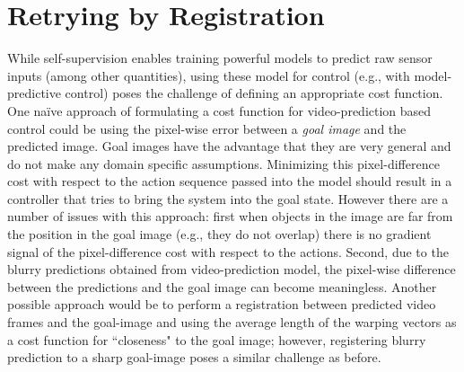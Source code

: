 \vspace{-0.1cm}
\section{Retrying by Registration}
\label{sec:reg}
\vspace{-0.2cm}




While self-supervision enables training powerful models to predict raw sensor inputs (among other quantities), using these model for control (e.g., with model-predictive control) poses the challenge of defining an appropriate cost function. One na\"{i}ve approach of formulating a cost function for video-prediction based control could be using the pixel-wise error between a \emph{goal image} and the predicted image. Goal images have the advantage that they are very general and do not make any domain specific assumptions. Minimizing this pixel-difference cost with respect to the action sequence passed into the model should result in a controller that tries to bring the system into the goal state. However there are a number of issues with this approach: first when objects in the image are far from the position in the goal image (e.g., they do not overlap) there is no gradient signal of the pixel-difference cost with respect to the actions. Second, due to the blurry predictions obtained from video-prediction model, the pixel-wise difference between the predictions and the goal image can become meaningless. Another possible approach would be to perform a registration between predicted video frames and the goal-image and using the average length of the warping vectors as a cost function for ``closeness" to the goal image; however, registering blurry prediction to a sharp goal-image poses a similar challenge as before. 

